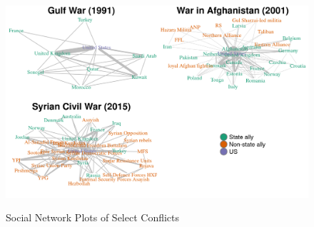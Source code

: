 \documentclass[fleqn,12pt]{article}
\begin{document}
\clearpage
{}
\newpage
\begin{figure}[h]
	\begin{center}
		\caption{Social Network Plots of Select Conflicts}
		{\includegraphics[width = \textwidth]{fig-actors-1.png}}
		\label{fig:fig-actors-1}
		\vspace{0.1 in}
	\end{center}
\end{figure}

\clearpage

\newpage


\end{document}
